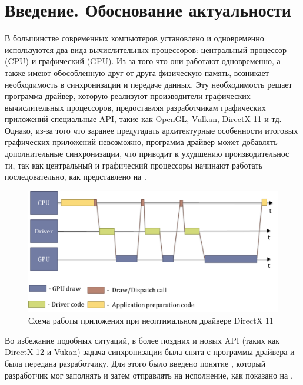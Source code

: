 \chapter*{Введение. Обоснование актуальности} %

В большинстве современных компьютеров установлено и одновременно используются два вида вычислительных процессоров: центральный процессор (CPU) и графический (GPU). Из-за того что они работают одновременно, а также имеют обособленную друг от друга физическую память, возникает необходимость в синхронизации и передаче данных. Эту необходимость решает программа-драйвер, которую реализуют производители графических вычислительных процессоров, предоставляя разработчикам графических приложений специальные API, такие как OpenGL, Vulkan, DirectX 11 и тд. Однако, из-за того что заранее предугадать архитектурные особенности итоговых графических приложений невозможно, программа-драйвер может добавлять дополнительные синхронизации, что приводит к ухудшению производительнос ти, так как центральный и графический процессоры начинают работать последовательно, как представлено на .

\begin{figure}[ht!] 
	\center
	\includegraphics [scale=0.23] {my_folder/images//pipeline_dx11}
	\caption{Схема работы приложения при неоптимальном драйвере DirectX 11} 
	\label{fig:pipeline_dx11}  
\end{figure}

Во избежание подобных ситуаций, в более поздних и новых API (таких как DirectX 12 и Vukan) задача синхронизации была снята с программы драйвера и была передана разработчику. Для этого было введено понятие , который разработчик мог заполнять и затем отправлять на исполнение, как показано на .

